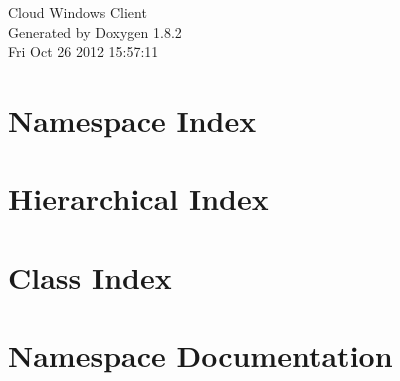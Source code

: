 \documentclass{book}
\begin{document}
\hypersetup{pageanchor=false,citecolor=blue}
\begin{titlepage}
\vspace*{7cm}
\begin{center}
{\Large Cloud Windows Client }\\
\vspace*{1cm}
{\large Generated by Doxygen 1.8.2}\\
\vspace*{0.5cm}
{\small Fri Oct 26 2012 15:57:11}\\
\end{center}
\end{titlepage}
\clearemptydoublepage
{}
\tableofcontents
\clearemptydoublepage
{}
\hypersetup{pageanchor=true,citecolor=blue}
\chapter{Namespace Index}

\chapter{Hierarchical Index}

\chapter{Class Index}

\chapter{Namespace Documentation}



















\end{document}
